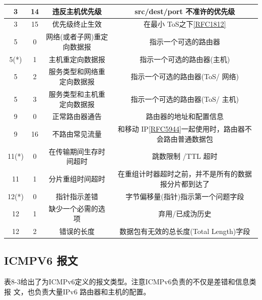 \begin{table}[H]
\begin{tabular}{c|c|c|c}
		3		&	14	&	违反主机优先级	&	src/dest/port 不准许的优先级 \\ \hline
		3		&	15	&	优先级终止生效	&	在最小 ToS之下\href{https://www.rfc-editor.org/rfc/rfc1812}{[RFC1812]} \\ \hline
		5		&	0	&	网络(或者子网)重定向数据报	&	指示一个可选的路由器 \\ \hline
		5(*)	&	1	&	主机重定向数据报	&	指示一个可选的路由器(主机) \\ \hline
		5		&	2	&	服务类型和网络重定向数据报	&	指示一个可选的路由器(ToS/ 网络) \\ \hline
		5		&	3	&	服务类型和主机重定向数据报	&	指示一个可选的路由器(ToS/ 主机) \\ \hline
		9		&	0	&	正常路由器通告	&	路由器的地址和配置信息 \\ \hline
		9		&	16	&	不路由常见流量	&	和移动 IP\href{https://www.rfc-editor.org/rfc/rfc5944}{[RFC5944]}一起使用时，路由器不会路由普通数据包 \\ \hline
		11(*)	&	0	&	在传输期间生存时间超时	&	跳数限制 /TTL 超时 \\ \hline
		11		&	1	&	分片重组时间超时	&	在重组计时器超时之前，并不是所有的数据报分片都到达了 \\ \hline
		12(*)	&	0	&	指针指示差错	&	字节偏移量(指针)指示第一个问题字段 \\ \hline
		12		&	1	&	缺少一个必需的选项	&	弃用/已成沩历史 \\ \hline
		12		&	2	&	错误的长度	&	数据包有无效的总长度(Total Length)字段 \\ \hline
    \end{tabular}
\end{table}

\subsection{ICMPV6 报文}
表8-3给出了为ICMPv6定义的报文类型。注意ICMPv6负责的不仅是差错和信息类报
文，也负责大量IPv6 路由器和主机的配置。

